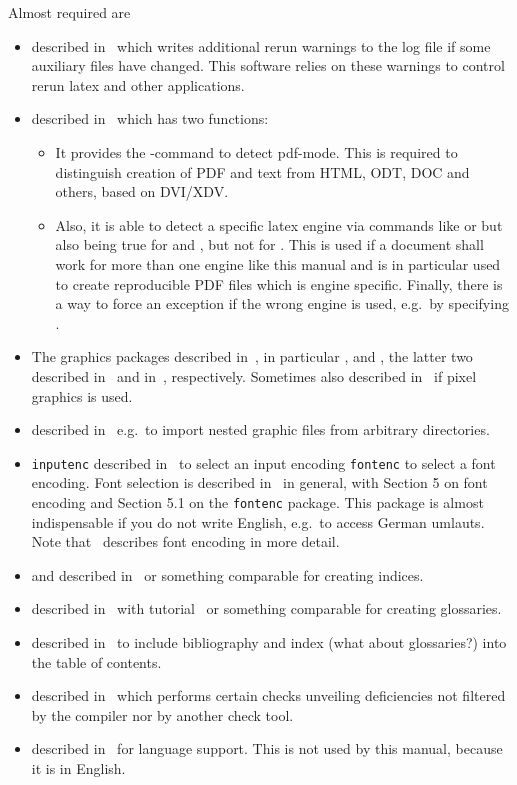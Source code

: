 \noindent
Almost required are 
%
\begin{itemize}
\item
{} described in~\cite{RerunFChkP} 
which writes additional rerun warnings to the log file 
if some auxiliary files have changed. 
This software relies on these warnings 
to control rerun latex and other applications. 
\item
{} described in~\cite{IfTeXP} which has two functions: 
\begin{itemize}
  \item 
  It provides the -command to detect pdf-mode. 
  This is required to distinguish creation of PDF and text 
  from HTML, ODT, DOC and others, based on DVI/XDV\@. 
  \item 
  Also, it is able to detect a specific latex engine via commands 
  like  or  but also  
  being true for \lualatex{} and \xelatex{}, but not for \pdflatex. 
  This is used if a document shall work for more than one engine 
  like this manual and is in particular used to create reproducible PDF files 
  which is engine specific. 
  Finally, there is a way to force an exception if the wrong engine is used, 
  e.g.~by specifying . 
\end{itemize}
\item
The graphics packages described in~\cite{GraX}, 
in particular ,  and , 
the latter two described in~\cite{XColorP} and in~\cite{TransP}, 
respectively. 
Sometimes also  described in~\cite{BmpP} 
if pixel graphics is used. 
\item
{} described in~\cite{ImpoP} 
e.g.~to import nested graphic files from arbitrary directories. 
\item
\texttt{inputenc} described in~\cite{InputencP} 
to select an input encoding 
\texttt{fontenc} to select a font encoding. 
Font selection is described in~\cite{FontSel} in general, 
with Section 5 on font encoding and 
Section 5.1 on the \texttt{fontenc} package. 
This package is almost indispensable if you do not write English, 
e.g.~to access German umlauts. 
Note that~\cite{FontEnc} describes font encoding in more detail. 
\item 
{} and  described in~\cite{MkidxShIdxP} 
or something comparable for creating indices. 
\item 
{} described in~\cite{GloP4_54} 
with tutorial~\cite{GloPGuide4_54}
or something comparable for creating glossaries. 
\item 
{} described in~\cite{TocBibIndP} 
to include bibliography and index (what about glossaries?) 
into the table of contents. 
\item 
{} described in~\cite{NagP} 
which performs certain checks unveiling deficiencies 
not filtered by the compiler nor by another check tool. 
\item 
{} described in~\cite{BabelP24} for language support. 
This is not used by this manual, because it is in English. 
\end{itemize}

